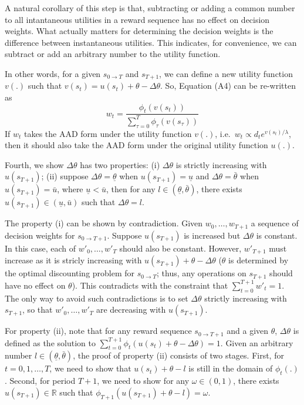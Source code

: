 \documentclass[
  12pt,
]{article}
\begin{document}
A natural corollary of this step is that, subtracting or adding a common
number to all intantaneous utilities in a reward sequence has no effect
on decision weights. What actually matters for determining the decision
weights is the difference between instantaneous utilities. This
indicates, for convenience, we can subtract or add an arbitrary number
to the utility function.

In other words, for a given \(s_{0\rightarrow T}\) and \(s_{T+1}\), we
can define a new utility function \(v(.)\) such that
\(v(s_t) = u(s_t) +\theta-\Delta \theta\). So, Equation (A4) can be
re-written as\[
w_t = \frac{\phi_t(v(s_t))}{\sum_{\tau=0}^{T}\phi_\tau(v(s_\tau))}
\]If \(w_t\) takes the AAD form under the utility function \(v(.)\),
i.e.~\(w_t \propto d_t e^{v(s_t)/\lambda}\), then it should also take
the AAD form under the original utility function \(u(.)\).

Fourth, we show \(\Delta \theta\) has two properties: (i)
\(\Delta \theta\) is strictly increasing with \(u(s_{T+1})\); (ii)
suppose \(\Delta \theta = \underline{\theta}\) when
\(u(s_{T+1})=\underline{u}\) and \(\Delta\theta=\bar{\theta}\) when
\(u(s_{T+1})=\bar{u}\), where \(\underline{u}<\bar{u}\), then for any
\(l \in(\underline{\theta},\bar{\theta})\), there exists
\(u(s_{T+1})\in(\underline{u},\bar{u})\) such that
\(\Delta \theta = l\).

The property (i) can be shown by contradiction. Given \(w_0,…,w_{T+1}\)
a sequence of decision weights for \(s_{0\rightarrow T+1}\). Suppose
\(u(s_{T+1})\) is increased but \(\Delta \theta\) is constant. In this
case, each of \(w'_0,…,w'_T\) should also be constant. However,
\(w'_{T+1}\) must increase as it is stricly increasing with
\(u(s_{T+1})+\theta-\Delta \theta\) (\(\theta\) is determined by the
optimal discounting problem for \(s_{0\rightarrow T}\); thus, any
operations on \(s_{T+1}\) should have no effect on \(\theta\)). This
contradicts with the constraint that \(\sum_{t=0}^{T+1} w'_t =1\). The
only way to avoid such contradictions is to set \(\Delta \theta\)
strictly increasing with \(s_{T+1}\), so that \(w'_0,…,w'_T\) are
decreasing with \(u(s_{T+1})\).

For property (ii), note that for any reward sequence
\(s_{0\rightarrow T+1}\) and a given \(\theta\), \(\Delta\theta\) is
defined as the solution to
\(\sum_{t=0}^{T+1} \phi_t(u(s_t)+\theta-\Delta\theta)=1\). Given an
arbitrary number \(l\in(\underline{\theta},\bar{\theta})\), the proof of
property (ii) consists of two stages. First, for \(t=0,1,…,T\), we need
to show that \(u(s_t)+\theta-l\) is still in the domain of
\(\phi_t(.)\). Second, for period \(T+1\), we need to show for any
\(\omega\in(0,1)\), there exists \(u(s_{T+1})\in \mathbb{R}\) such that
\(\phi_{T+1}(u(s_{T+1})+\theta-l)=\omega\).
\end{document}
